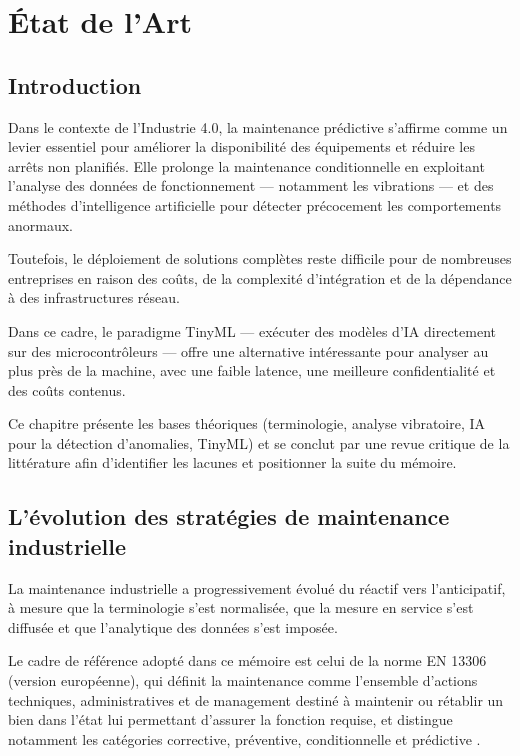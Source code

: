 \chapter{État de l'Art}
\label{chap:etat_art}

\section{Introduction}

Dans le contexte de l'Industrie 4.0, la maintenance prédictive s'affirme comme un levier essentiel pour améliorer la disponibilité des équipements et réduire les arrêts non planifiés. Elle prolonge la maintenance conditionnelle en exploitant l'analyse des données de fonctionnement — notamment les vibrations — et des méthodes d'intelligence artificielle pour détecter précocement les comportements anormaux.

Toutefois, le déploiement de solutions complètes reste difficile pour de nombreuses entreprises en raison des coûts, de la complexité d'intégration et de la dépendance à des infrastructures réseau.

Dans ce cadre, le paradigme TinyML — exécuter des modèles d'IA directement sur des microcontrôleurs — offre une alternative intéressante pour analyser au plus près de la machine, avec une faible latence, une meilleure confidentialité et des coûts contenus.

Ce chapitre présente les bases théoriques (terminologie, analyse vibratoire, IA pour la détection d'anomalies, TinyML) et se conclut par une revue critique de la littérature afin d'identifier les lacunes et positionner la suite du mémoire.

\section{L'évolution des stratégies de maintenance industrielle}

La maintenance industrielle a progressivement évolué du réactif vers l'anticipatif, à mesure que la terminologie s'est normalisée, que la mesure en service s'est diffusée et que l'analytique des données s'est imposée.

Le cadre de référence adopté dans ce mémoire est celui de la norme EN 13306 (version européenne), qui définit la maintenance comme l'ensemble d'actions techniques, administratives et de management destiné à maintenir ou rétablir un bien dans l'état lui permettant d'assurer la fonction requise, et distingue notamment les catégories corrective, préventive, conditionnelle et prédictive \cite{en13306}.

